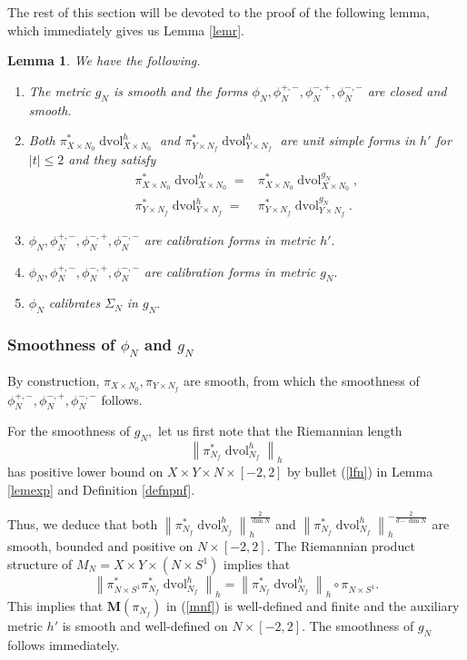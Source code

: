 \documentclass[11pt,a4paper]{amsart}
\numberwithin{equation}{section}
\newcommand{\Si}{\Sigma}
\newcommand{\ms}{\mathbf{M}}
\newcommand{\no}[1]{\left\lVert#1\right\rVert}
\newcommand{\dvol}{\operatorname{dvol}}
\newcommand{\du}{^\ast}
\newcommand{\pxn}{\pi_{X\times N_0}}
\newcommand{\pyn}{\pi_{Y\times N_f}}
\newcommand{\dvx}{\dvol_{X\times N_0}^{g_N}}
\newcommand{\dvy}{\dvol_{Y\times N_f}^{g_N}}
\theoremstyle{plain}
\newtheorem{lem}[exam]{Lemma}
\theoremstyle{definition}
\numberwithin{equation}{subsection}
\begin{document}
The rest of this section will be devoted to the proof of the following lemma, which immediately gives us Lemma \ref{lemr}.
\begin{lem}\label{lemfff}We have the following.
\begin{enumerate}
\item The metric $g_N$ is smooth and the forms $\phi_N,\phi_N^{+,-},\phi_N^{-,+},\phi_N^{-,-}$ are closed and smooth. 
\item Both  $\pxn\du\dvol^h_{X\times N_0}$ and $\pyn\du\dvol^h_{Y\times N_f}$ are unit simple forms in $h'$ for $|t|\le 2$ and they satisfy
\begin{align*}
	\pxn\du\dvol^h_{X\times N_0}=&\pxn\du\dvx,\\
	\pyn\du\dvol^h_{Y\times N_f}=&\pyn\du\dvy.
\end{align*} \label{cmsh'}
\item $\phi_N,\phi_N^{+,-},\phi_N^{-,+},\phi_N^{-,-}$ are calibration forms in metric $h'.$\label{ffmh'}
\item $\phi_N,\phi_N^{+,-},\phi_N^{-,+},\phi_N^{-,-}$ are calibration forms in metric $g_N.$
\item $\phi_N$ calibrates $\Si_N$ in $g_N.$
\end{enumerate}

\end{lem}
\subsubsection{Smoothness of $\phi_N$ and $g_N$}
By construction, $\pi_{X\times N_0},\pi_{Y\times N_f}$ are smooth, from which the smoothness of $\phi_N^{+,-},\phi_N^{-,+},\phi_N^{-,-}$ follows. %

For the smoothness of $g_N,$ let us first note that the Riemannian length $$\no{\pi_{N_f}\du \dvol^h_{N_f}}_h$$ has positive lower bound on $X\times Y\times N\times [-2,2]$ by bullet (\ref{lfn}) in Lemma \ref{lemexp} and Definition \ref{defnpnf}. 

Thus, we deduce that
both $\no{\pi_{N_f}\du \dvol^h_{N_f}}_h^{\frac{2}{\dim N}}
$ and $\no{\pi_{N_f}\du \dvol^h_{N_f}}_h^{-\frac{2}{d-\dim N}}
$ are smooth, bounded and positive on $N\times[-2,2].$  The Riemannian product structure of $M_N=X\times Y\times (N\times S^1)$ implies that
$$\no{\pi_{N\times S^1}\du\pi_{N_f}\du \dvol_{N_f}^h}_h=\no{\pi_{N_f}\du \dvol_{N_f}^h}_h\circ\pi_{N\times S^1}.$$This implies that $\ms(\pi_{N_f})$ in (\ref{mnf}) is well-defined and finite and the auxiliary metric $h'$ is smooth and well-defined on $N\times[-2,2].$ The smoothness of $g_N$ follows immediately.
\end{document}
